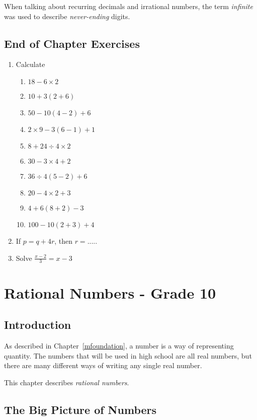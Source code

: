 \documentclass[10pt,a4paper,titlepage,twoside,openright]{report}
\begin{document}
When talking about recurring decimals and irrational numbers, the term \textit{infinite} was used to describe \textit{never-ending} digits. 


\section{End of Chapter Exercises}
\begin{enumerate}
\item Calculate
\begin{enumerate}
\item $18-6\times 2$
\item $10+3(2+6)$
\item $50-10(4-2)+6$
\item $2\times 9-3(6-1)+1$
\item $8+24\div 4\times 2$
\item $30-3\times 4+2$
\item $36\div 4(5-2)+6$
\item $20-4\times 2+3$
\item $4+6(8+2)-3$
\item $100-10(2+3)+4$
\end{enumerate}
\item{If $p = q+4r$, then $r =.....$}
\item{Solve $\frac{x-2}{3} = x-3$}
\end{enumerate}





\chapter{Rational Numbers - Grade 10}
\label{m:n:rn:10}

\section{Introduction}
\label{m:n:rn:10:intro}

As described in Chapter~\ref{mfoundation}, a number is a way of representing quantity. The numbers that will be used in high school are all real numbers, but there are many different ways of writing any single real number.

This chapter describes \textit{rational numbers}.

\section{The Big Picture of Numbers}
\end{document}
